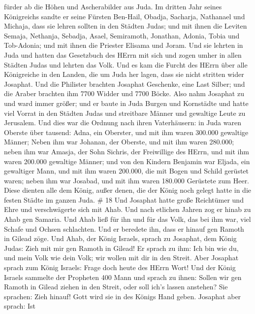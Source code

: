 fürder ab die Höhen und Ascherabilder aus Juda.  Im dritten
Jahr seines Königreichs sandte er seine Fürsten Ben-Hail, Obadja,
Sacharja, Nathanael und Michaja, dass sie lehren sollten in den Städten
Judas;  und mit ihnen die Leviten Semaja, Nethanja, Sebadja,
Asael, Semiramoth, Jonathan, Adonia, Tobia und Tob-Adonia; und mit ihnen
die Priester Elisama und Joram.  Und sie lehrten in Juda und
hatten das Gesetzbuch des HErrn mit sich und zogen umher in allen
Städten Judas und lehrten das Volk.  Und es kam die Furcht
des HErrn über alle Königreiche in den Landen, die um Juda her lagen,
dass sie nicht stritten wider Josaphat.  Und die Philister
brachten Josaphat Geschenke, eine Last Silber; und die Araber brachten
ihm 7700 Widder und 7700 Böcke.  Also nahm Josaphat zu und
ward immer größer; und er baute in Juda Burgen und Kornstädte
 und hatte viel Vorrat in den Städten Judas und streitbare
Männer und gewaltige Leute zu Jerusalem.  Und dies war die
Ordnung nach ihren Vaterhäusern: in Juda waren Oberste über tausend:
Adna, ein Oberster, und mit ihm waren 300.000 gewaltige Männer;
 Neben ihm war Johanan, der Oberste, und mit ihm waren
280.000;  neben ihm war Amasja, der Sohn Sichris, der
Freiwillige des HErrn, und mit ihm waren 200.000 gewaltige Männer;
 und von den Kindern Benjamin war Eljada, ein gewaltiger
Mann, und mit ihm waren 200.000, die mit Bogen und Schild gerüstet
waren;  neben ihm war Josabad, und mit ihm waren 180.000
Gerüstete zum Heer.  Diese dienten alle dem König, außer
denen, die der König noch gelegt hatte in die festen Städte im ganzen
Juda. \# 18  Und Josaphat hatte große Reichtümer und Ehre
und verschwägerte sich mit Ahab.  Und nach etlichen Jahren
zog er hinab zu Ahab gen Samaria. Und Ahab ließ für ihn und für das
Volk, das bei ihm war, viel Schafe und Ochsen schlachten. Und er
beredete ihn, dass er hinauf gen Ramoth in Gilead zöge.  Und
Ahab, der König Israels, sprach zu Josaphat, dem König Judas: Zieh mit
mir gen Ramoth in Gilead! Er sprach zu ihm: Ich bin wie du, und mein
Volk wie dein Volk; wir wollen mit dir in den Streit.  Aber
Josaphat sprach zum König Israels: Frage doch heute des HErrn Wort!
 Und der König Israels sammelte der Propheten 400 Mann und
sprach zu ihnen: Sollen wir gen Ramoth in Gilead ziehen in den Streit,
oder soll ich's lassen anstehen? Sie sprachen: Zieh hinauf! Gott wird
sie in des Königs Hand geben.  Josaphat aber sprach: Ist
